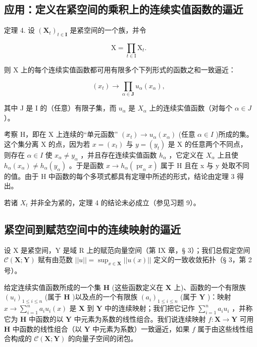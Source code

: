 \subsection{应用：定义在紧空间的乘积上的连续实值函数的逼近}

定理 4. 设 \((\mathbf{X}_t)_{t\in \mathbf{I}}\) 是紧空间的一个族，并令

\[
\mathrm{X} = \prod_ {t \in \mathrm{I}} \mathrm{X} _ {t}.
\]

则 X 上的每个连续实值函数都可用有限多个下列形式的函数之和一致逼近：

\[
(x _ {t}) \rightarrow \prod_ {\alpha \in \mathbf {J}} u _ {\alpha} (x _ {\alpha}),
\]

其中 J 是 I 的（任意）有限子集，而 \(u_{\alpha}\) 是 \(X_{\alpha}\) 上的连续实值函数（对每个 \(\alpha \in J\) ）。

考察 H，即在 X 上连续的“单元函数” \((x_{t}) \rightarrow u_{\alpha}(x_{\alpha})\) (任意 \(\alpha \in I\) )所成的集。这个集分离 X 的点，因为若 \(x = (x_{t})\) 与 \(y = (y_{t})\) 是 X 的任意两个不同点，则存在 \(\alpha \in I\) 使 \(x_{\alpha} \neq y_{\alpha}\) ，并且存在连续实值函数 \(h_{\alpha}\) ，它定义在 \(X_{\alpha}\) 上且使 \(h_{\alpha}(x_{\alpha}) \neq h_{\alpha}(y_{\alpha})\) 。于是函数 \(x \rightarrow h_{\alpha}(\operatorname{pr}_{\alpha} x)\) 属于 H 且在 x 与 y 处取不同的值。由于 H 中函数的每个多项式都具有定理中所述的形式，结论由定理 3 得出。

若诸 \(X_{t}\) 并非全为紧的，定理 4 的结论未必成立（参见习题 9）。

\subsection{紧空间到赋范空间中的连续映射的逼近}

设 X 是紧空间，Y 是域 R 上的赋范向量空间（第 IX 章，§ 3）；我们总假定空间 \(\mathcal{C}(\mathbf{X};\mathbf{Y})\) 赋有由范数 \(||u|| = \sup_{x\in \mathbf{X}}||u(x)||\) 定义的一致收敛拓扑（§ 3，第 2 号）。

给定连续实值函数所成的一个集 \(\mathbf{H}\) (这些函数定义在 \(\mathbf{X}\) 上)、函数的一个有限族 \((u_i)_{1\leqslant i\leqslant n}\) (属于 \(\mathbf{H}\) )以及点的一个有限族 \((a_i)_{1\leqslant i\leqslant n}\) (属于 \(\mathbf{Y}\) )：映射 \(x\to \sum_{i = 1}^{n}a_iu_i(x)\) 是 \(\mathbf{X}\) 到 \(\mathbf{Y}\) 中的连续映射；我们把它记作 \(\sum_{i = 1}^{n}a_iu_i\) ，并称它为 \(\mathbf{H}\) 中函数的以 \(\mathbf{Y}\) 中元素为系数的线性组合。我们说连续映射 \(f:\mathbf{X}\rightarrow \mathbf{Y}\) 可用 \(\mathbf{H}\) 中函数的线性组合（以 \(\mathbf{Y}\) 中元素为系数）一致逼近，如果 \(f\) 属于由这些线性组合构成的 \(\mathcal{C}(\mathbf{X};\mathbf{Y})\) 的向量子空间的闭包。

